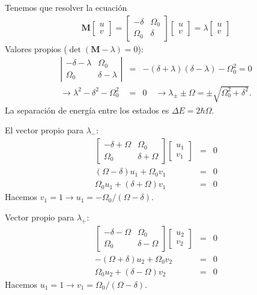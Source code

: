 \documentclass[twocolumn,aps,eqsecnum]{revtex4}
\begin{document}
Tenemos que resolver la ecuaci\'on 
%
\begin{eqnarray*}
\mathbf{M} \left[ \begin{array}{c} u \\ v \end{array} \right] 
    = \left[ \begin{array}{cc} -\delta & \Omega_0 \\ 
    \Omega_0 & \delta \end{array} \right]  
    \left[ \begin{array}{c} u \\ v \end{array} \right] 
    = \lambda \left[ \begin{array}{c} u \\ v \end{array} \right]
\end{eqnarray*}
Valores propios ($\det(\mathbf{M} -\lambda) =0$):  
%
\begin{eqnarray*}
\left| \begin{array}{cc} -\delta - \lambda & \Omega_0 \\ 
    \Omega_0 & \delta -\lambda \end{array} \right| 
    &=& -(\delta +\lambda)(\delta -\lambda) - \Omega_0^2 = 0  \\  
\to \lambda^2 -\delta^2 - \Omega_0^2 &=& 0 \quad 
    \to \lambda_{\pm} \pm \Omega = \pm \sqrt{\Omega_0^2 +\delta^2} .
\end{eqnarray*}
La separaci\'on de energ\'ia entre los estados es 
$\Delta E = 2\hbar \Omega$. 

El vector propio para $\lambda_-$: 
%
\begin{eqnarray*}
\left[ \begin{array}{cc} -\delta +\Omega & \Omega_0 \\ 
    \Omega_0 & \delta +\Omega \end{array} \right]  
    \left[ \begin{array}{c} u_1 \\ v_1 \end{array} \right] &=& 0 \\ 
%
(\Omega -\delta) u_1 + \Omega_0 v_1 &=& 0     \\ 
\Omega_0 u_1 +(\delta +\Omega) v_1 &=& 0 
\end{eqnarray*}
Hacemos $v_1 =1 \to u_1 = -\Omega_0/(\Omega -\delta)$. 

Vector propio para $\lambda_+$: 
%
\begin{eqnarray*}
\left[ \begin{array}{cc} -\delta -\Omega & \Omega_0 \\ 
    \Omega_0 & \delta -\Omega \end{array} \right]  
    \left[ \begin{array}{c} u_2 \\ v_2 \end{array} \right] &=& 0 \\ 
%
-(\Omega +\delta) u_2 + \Omega_0 v_2 &=& 0     \\ 
\Omega_0 u_2 +(\delta -\Omega) v_2 &=& 0 
\end{eqnarray*}
Hacemos $u_1 =1 \to v_1 = \Omega_0/(\Omega -\delta)$. 
\end{document}
